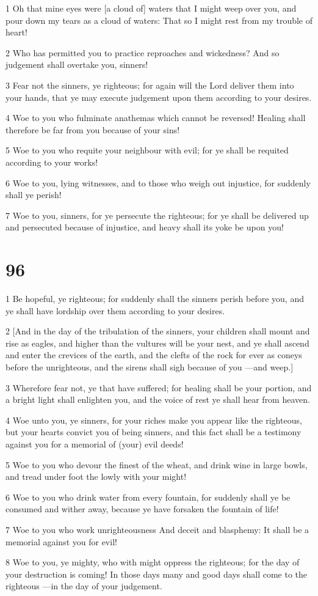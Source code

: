 \par 1 Oh that mine eyes were [a cloud of] waters that I might weep over you, and pour down my tears as a cloud of waters: That so I might rest from my trouble of heart!
\par 2 Who has permitted you to practice reproaches and wickedness? And so judgement shall overtake you, sinners!
\par 3 Fear not the sinners, ye righteous; for again will the Lord deliver them into your hands, that ye may execute judgement upon them according to your desires.
\par 4 Woe to you who fulminate anathemas which cannot be reversed! Healing shall therefore be far from you because of your sins!
\par 5 Woe to you who requite your neighbour with evil; for ye shall be requited according to your works!
\par 6 Woe to you, lying witnesses, and to those who weigh out injustice, for suddenly shall ye perish!
\par 7 Woe to you, sinners, for ye persecute the righteous; for ye shall be delivered up and persecuted because of injustice, and heavy shall its yoke be upon you!

\chapter{96}

\par 1 Be hopeful, ye righteous; for suddenly shall the sinners perish before you, and ye shall have lordship over them according to your desires.
\par 2 [And in the day of the tribulation of the sinners, your children shall mount and rise as eagles, and higher than the vultures will be your nest, and ye shall ascend and enter the crevices of the earth, and the clefts of the rock for ever as coneys before the unrighteous, and the sirens shall sigh because of you —and weep.]
\par 3 Wherefore fear not, ye that have suffered; for healing shall be your portion, and a bright light shall enlighten you, and the voice of rest ye shall hear from heaven.
\par 4 Woe unto you, ye sinners, for your riches make you appear like the righteous, but your hearts convict you of being sinners, and this fact shall be a testimony against you for a memorial of (your) evil deeds!
\par 5 Woe to you who devour the finest of the wheat, and drink wine in large bowls, and tread under foot the lowly with your might!
\par 6 Woe to you who drink water from every fountain, for suddenly shall ye be consumed and wither away, because ye have forsaken the fountain of life!
\par 7 Woe to you who work unrighteousness And deceit and blasphemy: It shall be a memorial against you for evil!
\par 8 Woe to you, ye mighty, who with might oppress the righteous; for the day of your destruction is coming! In those days many and good days shall come to the righteous —in the day of your judgement.

